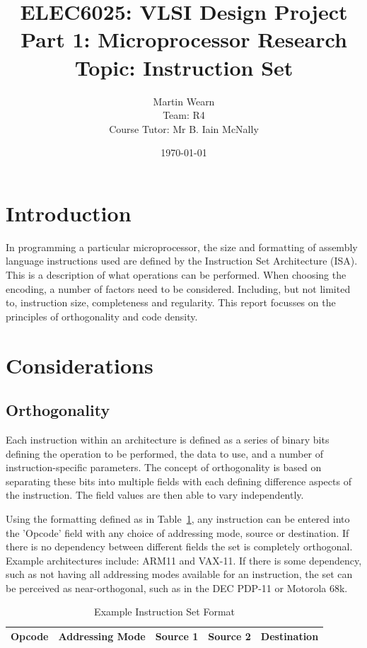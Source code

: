 \documentclass[12pt,a4paper]{article}
\title{ELEC6025: VLSI Design Project \\Part 1: Microprocessor Research\\Topic: Instruction Set}
\author{Martin Wearn\\ Team: R4\\Course Tutor: Mr B. Iain McNally}
\date{\today}
\begin{document}
\begin{titlepage}
\maketitle
\end{titlepage}

\tableofcontents
\clearpage

\section{Introduction}
In programming a particular microprocessor, the size and formatting of assembly language instructions used are defined by the Instruction Set Architecture (ISA). This is a description of what operations can be performed. When choosing the encoding, a number of factors need to be considered. Including, but not limited to, instruction size, completeness and regularity. This report focusses on the principles of orthogonality and code density. 

\section{Considerations}

\subsection{Orthogonality}
Each instruction within an architecture is defined as a series of binary bits defining the operation to be performed, the data to use, and a number of instruction-specific parameters. The concept of orthogonality is based on separating these bits into multiple fields with each defining difference aspects of the instruction. The field values are then able to vary independently. \cite{wiki:OrthogonalIS}

Using the formatting defined as in Table~\ref{tab:ExFormat}, any instruction can be entered into the 'Opcode' field with any choice of addressing mode, source or destination. If there is no dependency between different fields the set is completely orthogonal. Example architectures include: ARM11 and VAX-11. \cite{wiki:OrthogonalIS}
If there is some dependency, such as not having all addressing modes available for an instruction, the set can be perceived as near-orthogonal, such as in the DEC PDP-11 or Motorola 68k. \cite{wiki:OrthogonalIS}

\begin{table}[h]
	\centering
	\begin{tabular}{|c|c|c|c|c|}
	\hline Opcode & Addressing Mode & Source 1 & Source 2 & Destination \\ \hline
	\end{tabular}
	\caption{\label{tab:ExFormat}Example Instruction Set Format}
\end{table}
\end{document}
